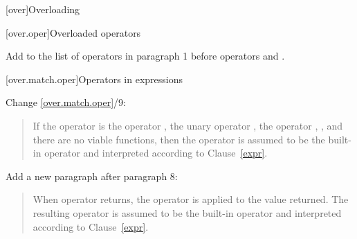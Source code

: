 
\setcounter{chapter}{12}
[over]{Overloading}

\setcounter{section}{4}
[over.oper]{Overloaded operators}

Add  to the list of operators in paragraph 1 before operators \tcode{()} and \tcode{[]}.

\setcounter{section}{3}
\setcounter{subsection}{1}
\setcounter{subsubsection}{1}
[over.match.oper]{Operators in expressions}%

Change \ref{over.match.oper}/9:

\begin{quote}
\setcounter{Paras}{8}
\pnum
If the operator is the operator
\tcode{,},
the unary operator
\tcode{\&},
 the operator
\tcode{->},
,
and there are no viable functions, then the operator is
assumed to be the built-in operator and interpreted according to
Clause~\ref{expr}.
\end{quote}

Add a new paragraph after paragraph 8:

\begin{quote}
\setcounter{Paras}{8}
\pnum
  When operator  returns, the  operator is applied to the value returned. The resulting  operator is assumed to be the built-in operator and interpreted according to Clause~\ref{expr}.
\end{quote}


%

